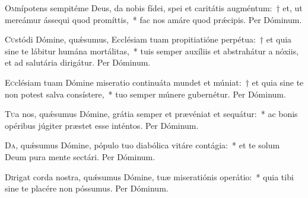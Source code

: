 \documentclass[vesperale_romanum.tex]{subfiles}
\begin{document}


\oratio

\lettrine{O}{m}nípotens sempitéme Deus, da nobis fídei, spei et caritátis augméntum:~† et, ut mereámur ássequi quod promíttis,~* fac nos amáre quod prǽcipis. Per Dóminum.



\oratio

\lettrine{C}{u}stódi Dómine, quǽsumus, Ecclésiam tuam propitiatióne perpétua:~† et quia sine te lábitur humána mortálitas,~* tuis semper auxíliis et abstrahátur a nóxiis, et ad salutária dirigátur. Per Dóminum. 



\oratio

\lettrine{E}{c}clésiam tuam Dómine miseratio continuáta mundet et múniat:~† et quia sine te non potest salva consístere,~* tuo semper múnere gubernétur. Per Dóminum.



\oratio

\lettrine{T}{u}a nos, quǽsumus Dómine, grátia semper et prævéniat et sequátur:~* ac bonis opéribus júgiter præstet esse inténtos.
Per Dóminum.


\oratio

\lettrine{D}{a}, quǽsumus Dómine, pópulo tuo diabólica vitáre contágia:~* et te solum Deum pura mente sectári. Per Dóminum.



\oratio

\lettrine{D}{i}rigat corda nostra, quǽsumus Dómine, tuæ miseratiónis operátio:~* quia tibi sine te placére non póssumus. Per Dóminum.
\end{document}
